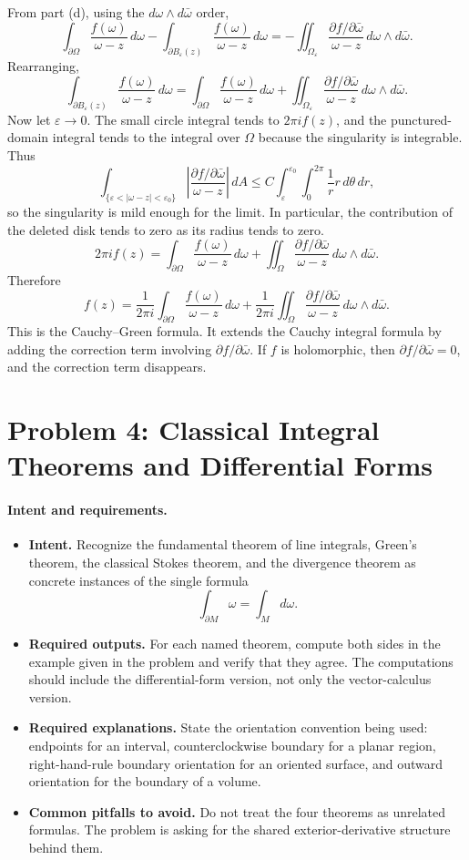 \documentclass[11pt]{article}
\newenvironment{intentrequirements}{%
\paragraph{Intent and requirements.}
\begin{itemize}[leftmargin=*, itemsep=0.25em]
}{%
\end{itemize}
}
\newcommand{\pd}{\partial}
\newcommand{\eps}{\varepsilon}
\begin{document}
From part (d), using the $d\omega\wedge d\bar\omega$ order,
\[
 \int_{\partial\Omega}\frac{f(\omega)}{\omega-z}\,d\omega
 -
 \int_{\partial B_\eps(z)}\frac{f(\omega)}{\omega-z}\,d\omega
 =
 -
 \iint_{\Omega_\eps}
 \frac{\pd f/\pd\bar\omega}{\omega-z}\,
 d\omega\wedge d\bar\omega.
\]
Rearranging,
\[
 \int_{\partial B_\eps(z)}\frac{f(\omega)}{\omega-z}\,d\omega
 =
 \int_{\partial\Omega}\frac{f(\omega)}{\omega-z}\,d\omega
 +
 \iint_{\Omega_\eps}
 \frac{\pd f/\pd\bar\omega}{\omega-z}\,
 d\omega\wedge d\bar\omega.
\]
Now let $\eps\to0$. The small circle integral tends to $2\pi i f(z)$, and the punctured-domain integral tends to the integral over $\Omega$ because the singularity is integrable. Thus
\[
 \int_{\{\eps<|\omega-z|<\eps_0\}}
 \left|\frac{\pd f/\pd\bar\omega}{\omega-z}\right|\,dA
 \leq
 C\int_\eps^{\eps_0}\int_0^{2\pi}\frac{1}{r}r\,d\theta\,dr,
\]
so the singularity is mild enough for the limit. In particular, the contribution of the deleted disk tends to zero as its radius tends to zero.
\[
 2\pi i f(z)
 =
 \int_{\partial\Omega}\frac{f(\omega)}{\omega-z}\,d\omega
 +
 \iint_{\Omega}
 \frac{\pd f/\pd\bar\omega}{\omega-z}\,
 d\omega\wedge d\bar\omega.
\]
Therefore
\[
 \boxed{
 f(z)=
 \frac{1}{2\pi i}
 \int_{\partial\Omega}
 \frac{f(\omega)}{\omega-z}\,d\omega
 +
 \frac{1}{2\pi i}
 \iint_{\Omega}
 \frac{\pd f/\pd\bar\omega}{\omega-z}\,
 d\omega\wedge d\bar\omega.
 }
\]
This is the Cauchy--Green formula. It extends the Cauchy integral formula by adding the correction term involving $\pd f/\pd\bar\omega$. If $f$ is holomorphic, then $\pd f/\pd\bar\omega=0$, and the correction term disappears.

\section*{Problem 4: Classical Integral Theorems and Differential Forms}

\begin{intentrequirements}
\item \textbf{Intent.} Recognize the fundamental theorem of line integrals, Green's theorem, the classical Stokes theorem, and the divergence theorem as concrete instances of the single formula
\[
 \int_{\partial M}\omega=\int_M d\omega.
\]
\item \textbf{Required outputs.} For each named theorem, compute both sides in the example given in the problem and verify that they agree. The computations should include the differential-form version, not only the vector-calculus version.
\item \textbf{Required explanations.} State the orientation convention being used: endpoints for an interval, counterclockwise boundary for a planar region, right-hand-rule boundary orientation for an oriented surface, and outward orientation for the boundary of a volume.
\item \textbf{Common pitfalls to avoid.} Do not treat the four theorems as unrelated formulas. The problem is asking for the shared exterior-derivative structure behind them.
\end{intentrequirements}
\end{document}
